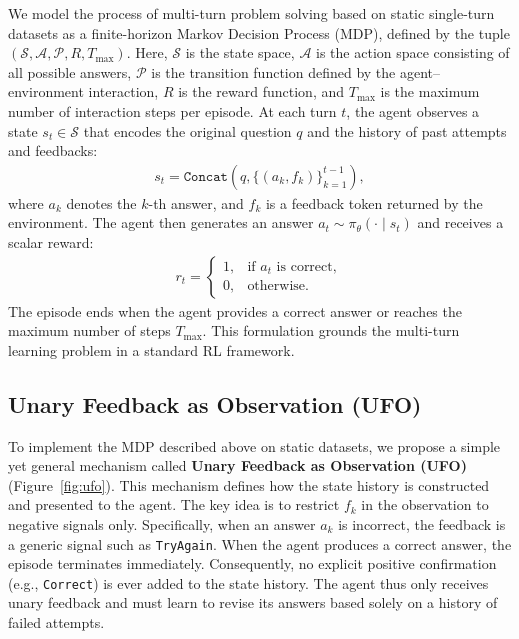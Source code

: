 We model the process of multi-turn problem solving based on static single-turn datasets as a finite-horizon Markov Decision Process (MDP), defined by the tuple $(\mathcal{S}, \mathcal{A}, \mathcal{P}, R, T_{\text{max}})$. Here, $\mathcal{S}$ is the state space, $\mathcal{A}$ is the action space consisting of all possible answers, $\mathcal{P}$ is the transition function defined by the agent–environment interaction, $R$ is the reward function, and $T_{\text{max}}$ is the maximum number of interaction steps per episode.
At each turn $t$, the agent observes a state $s_t \in \mathcal{S}$ that encodes the original question $q$ and the history of past attempts and feedbacks:
\begin{align}
    s_t = \texttt{Concat}(q, \{(a_k, f_k)\}_{k=1}^{t-1}),
\end{align}
where $a_k$ denotes the $k$-th answer, and $f_k$ is a feedback token returned by the environment. The agent then generates an answer $a_t \sim \pi_\theta(\cdot \mid s_t)$ and receives a scalar reward:
\begin{align}
    r_t = 
    \begin{cases}
        1, & \text{if } a_t \text{ is correct}, \\
        0, & \text{otherwise}.
    \end{cases}
\end{align}
The episode ends when the agent provides a correct answer or reaches the maximum number of steps $T_{\text{max}}$.
This formulation grounds the multi-turn learning problem in a standard RL framework.

\subsection{Unary Feedback as Observation (UFO)}

To implement the MDP described above on static datasets, we propose a simple yet general mechanism called \textbf{Unary Feedback as Observation (UFO)} (Figure~\ref{fig:ufo}). This mechanism defines how the state history is constructed and presented to the agent. The key idea is to restrict $f_k$ in the observation to negative signals only. Specifically, when an answer $a_k$ is incorrect, the feedback is a generic signal such as \texttt{TryAgain}. When the agent produces a correct answer, the episode terminates immediately. Consequently, no explicit positive confirmation (e.g., \texttt{Correct}) is ever added to the state history. The agent thus only receives unary feedback and must learn to revise its answers based solely on a history of failed attempts.


